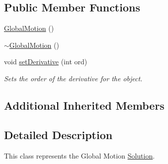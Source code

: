 \subsection*{Public Member Functions}
\begin{DoxyCompactItemize}
\item 
\hyperlink{classosea_1_1ofreq_1_1_global_motion_afe0b801895608782addf27d231bce572}{Global\-Motion} ()
\item 
\hyperlink{classosea_1_1ofreq_1_1_global_motion_aee21eade3de9cb666a6b8fa42cf1e9e1}{$\sim$\-Global\-Motion} ()
\item 
void \hyperlink{classosea_1_1ofreq_1_1_global_motion_a15a8c0d57ffedf65a1cd84154cdaa6ae}{set\-Derivative} (int ord)
\begin{DoxyCompactList}\small\item\em Sets the order of the derivative for the object. \end{DoxyCompactList}\end{DoxyCompactItemize}
\subsection*{Additional Inherited Members}


\subsection{Detailed Description}
This class represents the Global Motion \hyperlink{classosea_1_1ofreq_1_1_solution}{Solution}. 

